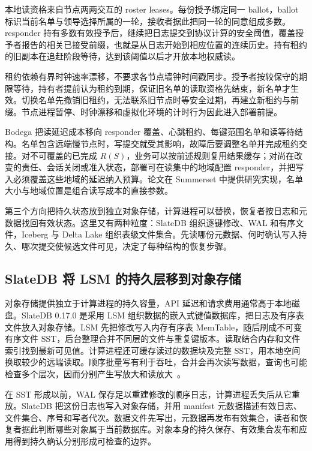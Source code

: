 本地读资格来自节点两两交互的 roster leases。每份授予绑定同一 ballot，ballot 标识当前名单与领导选择所属的一轮，接收者据此把同一轮的同意组成多数。responder 持有多数有效授予后，继续把日志提交到协议计算的安全阈值，覆盖授予者报告的相关已接受前缀，也就是从日志开始到相应位置的连续历史。持有租约的旧副本在追赶阶段等待，达到该阈值以后才开放本地权威读。

租约依赖有界时钟速率漂移，不要求各节点墙钟时间戳同步。授予者按较保守的期限等待，持有者提前认为租约到期，保证旧名单的读取资格先结束，新名单才生效。切换名单先撤销旧租约，无法联系旧节点时等安全过期，再建立新租约与前缀。节点进程暂停、时钟漂移和虚拟化环境的计时行为因此进入部署前提。

Bodega 把读延迟成本移向 responder 覆盖、心跳租约、每键范围名单和读等待结构。名单包含远端慢节点时，写提交就受其影响，故障后要调整名单并完成租约交接。对不可覆盖的已完成 $R(S)$，业务可以按前述规则复用结果缓存；对尚在改变的责任、会话关闭或准入状态，部署可在读集中的地域配置 responder，并把写入必须覆盖这些地域的延迟纳入预算。论文在 Summerset 中提供研究实现，名单大小与地域位置是组合读写成本的直接参数。

第三个方向把持久状态放到独立对象存储，计算进程可以替换，恢复者按日志和元数据找回有效状态。这里又有两种粒度：SlateDB 组织逐键修改、WAL 和有序文件，Iceberg 与 Delta Lake 组织表级文件集合。先读哪份元数据、何时确认写入持久、哪次提交使候选文件可见，决定了每种结构的恢复步骤。

\subsection{SlateDB 将 LSM 的持久层移到对象存储}

对象存储提供独立于计算进程的持久容量，API 延迟和请求费用通常高于本地磁盘。SlateDB 0.17.0 是采用 LSM 组织数据的嵌入式键值数据库，把日志及有序表文件放入对象存储。LSM 先把修改写入内存有序表 MemTable，随后刷成不可变有序文件 SST，后台整理合并不同层的文件与重复键版本。读取结合内存和文件索引找到最新可见值。计算进程还可缓存读过的数据块及完整 SST，用本地空间换取较少的远端读取。顺序批量写有利于吞吐，合并会再次读写数据，查询也可能检查多个层次，因而分别产生写放大和读放大~\cite{ch21-slatedb}。

在 SST 形成以前，WAL 保存足以重建修改的顺序日志，计算进程丢失后从它重放。SlateDB 把这份日志也写入对象存储，并用 manifest 元数据描述有效日志、文件集合、序号和写者代次。数据文件先写出，元数据再发布有效集合，读者和恢复者据此判断哪些对象属于当前数据库。对象本身的持久保存、有效集合发布和应用得到持久确认分别形成可检查的边界。


